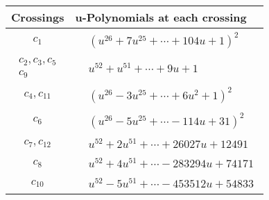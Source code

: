 \documentclass[1p]{elsarticle_modified}
\theoremstyle{definition}
\begin{document}
\begin{tabular}{m{50pt}|m{274pt}}
Crossings & \hspace{64pt}u-Polynomials at each crossing \\
\hline $$\begin{aligned}c_{1}\end{aligned}$$&$\begin{aligned}
&(u^{26}+7 u^{25}+\cdots+104 u+1)^{2}
\end{aligned}$\\
\hline $$\begin{aligned}c_{2},c_{3},c_{5}\\c_{9}\end{aligned}$$&$\begin{aligned}
&u^{52}+u^{51}+\cdots+9 u+1
\end{aligned}$\\
\hline $$\begin{aligned}c_{4},c_{11}\end{aligned}$$&$\begin{aligned}
&(u^{26}-3 u^{25}+\cdots+6 u^2+1)^{2}
\end{aligned}$\\
\hline $$\begin{aligned}c_{6}\end{aligned}$$&$\begin{aligned}
&(u^{26}-5 u^{25}+\cdots-114 u+31)^{2}
\end{aligned}$\\
\hline $$\begin{aligned}c_{7},c_{12}\end{aligned}$$&$\begin{aligned}
&u^{52}+2 u^{51}+\cdots+26027 u+12491
\end{aligned}$\\
\hline $$\begin{aligned}c_{8}\end{aligned}$$&$\begin{aligned}
&u^{52}+4 u^{51}+\cdots-283294 u+74171
\end{aligned}$\\
\hline $$\begin{aligned}c_{10}\end{aligned}$$&$\begin{aligned}
&u^{52}-5 u^{51}+\cdots-453512 u+54833
\end{aligned}$\\
\hline
\end{tabular}\\~\\
\end{document}
